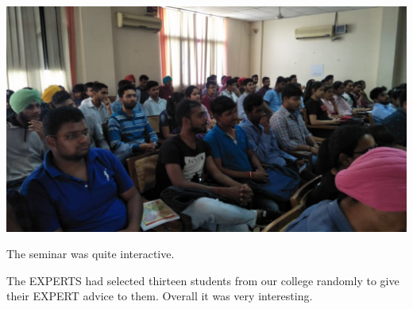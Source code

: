 \documentclass[12pt, a4 paper]{article}
\begin{document}
\begin{center}
\begin{Large}
\begin{multicols}{2}
\end{multicols}

\begin{multicols}{2}
\includegraphics[width=\linewidth]{image5.jpeg}

\columnbreak
The seminar was quite interactive.
  
\end{multicols} 

The EXPERTS had selected thirteen students from our college randomly to give their EXPERT advice to them. Overall it was very interesting.

  


  

\end{Large} 
\end{center}

\newpage 
\end{document}

